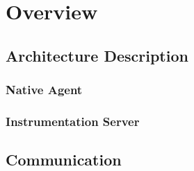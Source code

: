 \chapter{Overview}
\section{Architecture Description}
\subsection{Native Agent}
\subsection{Instrumentation Server}
\section{Communication}